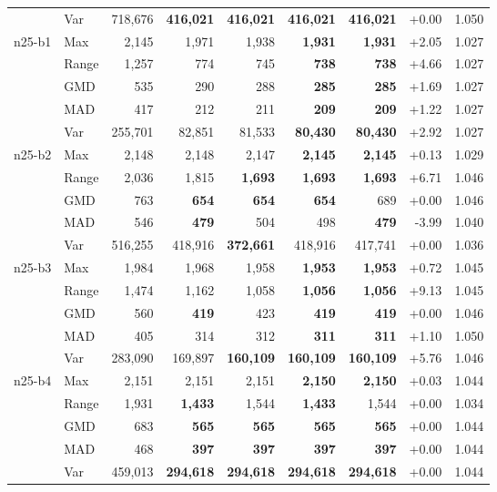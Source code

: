 \begin{small}
\begin{longtable}{llrrrrrrr}
 & Var & 718,676 & \textbf{416,021} & \textbf{416,021} & \textbf{416,021} & \textbf{416,021} & +0.00 & 1.050 \\
n25-b1 & Max & 2,145 & 1,971 & 1,938 & \textbf{1,931} & \textbf{1,931} & +2.05 & 1.027 \\
 & Range & 1,257 & 774 & 745 & \textbf{738} & \textbf{738} & +4.66 & 1.027 \\
 & GMD & 535 & 290 & 288 & \textbf{285} & \textbf{285} & +1.69 & 1.027 \\
 & MAD & 417 & 212 & 211 & \textbf{209} & \textbf{209} & +1.22 & 1.027 \\
 & Var & 255,701 & 82,851 & 81,533 & \textbf{80,430} & \textbf{80,430} & +2.92 & 1.027 \\
n25-b2 & Max & 2,148 & 2,148 & 2,147 & \textbf{2,145} & \textbf{2,145} & +0.13 & 1.029 \\
 & Range & 2,036 & 1,815 & \textbf{1,693} & \textbf{1,693} & \textbf{1,693} & +6.71 & 1.046 \\
 & GMD & 763 & \textbf{654} & \textbf{654} & \textbf{654} & 689 & +0.00 & 1.046 \\
 & MAD & 546 & \textbf{479} & 504 & 498 & \textbf{479} & -3.99 & 1.040 \\
 & Var & 516,255 & 418,916 & \textbf{372,661} & 418,916 & 417,741 & +0.00 & 1.036 \\
n25-b3 & Max & 1,984 & 1,968 & 1,958 & \textbf{1,953} & \textbf{1,953} & +0.72 & 1.045 \\
 & Range & 1,474 & 1,162 & 1,058 & \textbf{1,056} & \textbf{1,056} & +9.13 & 1.045 \\
 & GMD & 560 & \textbf{419} & 423 & \textbf{419} & \textbf{419} & +0.00 & 1.046 \\
 & MAD & 405 & 314 & 312 & \textbf{311} & \textbf{311} & +1.10 & 1.050 \\
 & Var & 283,090 & 169,897 & \textbf{160,109} & \textbf{160,109} & \textbf{160,109} & +5.76 & 1.046 \\
n25-b4 & Max & 2,151 & 2,151 & 2,151 & \textbf{2,150} & \textbf{2,150} & +0.03 & 1.044 \\
 & Range & 1,931 & \textbf{1,433} & 1,544 & \textbf{1,433} & 1,544 & +0.00 & 1.034 \\
 & GMD & 683 & \textbf{565} & \textbf{565} & \textbf{565} & \textbf{565} & +0.00 & 1.044 \\
 & MAD & 468 & \textbf{397} & \textbf{397} & \textbf{397} & \textbf{397} & +0.00 & 1.044 \\
 & Var & 459,013 & \textbf{294,618} & \textbf{294,618} & \textbf{294,618} & \textbf{294,618} & +0.00 & 1.044 \\

\end{longtable}
\end{small}
